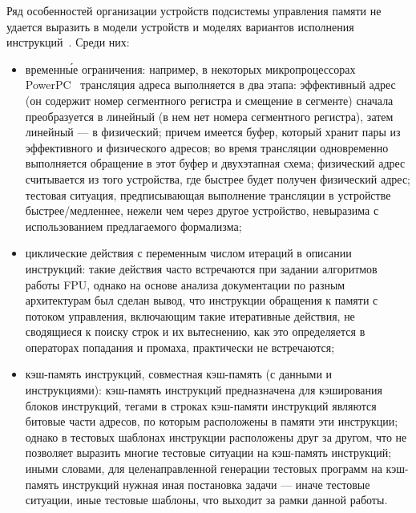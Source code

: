 Ряд особенностей организации устройств подсистемы управления памяти не удается выразить в модели устройств и моделях вариантов исполнения инструкций~\cite{my_ewdts_2009}. Среди них:
\begin{itemize}
    \item временн\'{ы}е ограничения: например, в некоторых микропроцессорах\\ PowerPC~\cite{PowerPC} трансляция адреса выполняется в два этапа: эффективный адрес (он содержит номер сегментного регистра и смещение в сегменте) сначала преобразуется в линейный (в нем нет номера сегментного регистра), затем линейный --- в физический; причем имеется буфер, который хранит пары из эффективного и физического адресов; во время трансляции одновременно выполняется обращение в этот буфер и двухэтапная схема; физический адрес считывается из того устройства, где быстрее будет получен физический адрес; тестовая ситуация, предписывающая выполнение трансляции в устройстве быстрее/медленнее, нежели чем через другое устройство, невыразима с использованием предлагаемого формализма;
    \item циклические действия с переменным числом итераций в описании инструкций: такие действия часто встречаются при задании алгоритмов работы FPU, однако на основе анализа документации по разным архитектурам был сделан вывод, что инструкции обращения к памяти с потоком управления, включающим такие итеративные действия, не сводящиеся к поиску строк и их вытеснению, как это определяется в операторах попадания и промаха, практически не встречаются;
    \item кэш-память инструкций, совместная кэш-память (с данными и инструкциями): кэш-память инструкций предназначена для кэширования блоков инструкций, тегами в строках кэш-памяти инструкций являются битовые части адресов, по которым расположены в памяти эти инструкции; однако в тестовых шаблонах инструкции расположены друг за другом, что не позволяет выразить многие тестовые ситуации на кэш-память инструкций; иными словами, для целенаправленной генерации тестовых программ на кэш-память инструкций нужная иная постановка задачи --- иначе тестовые ситуации, иные тестовые шаблоны, что выходит за рамки данной работы.
\end{itemize}







